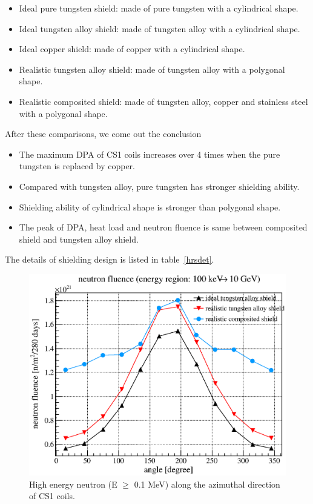 \begin{itemize}
 \setlength{\itemsep}{-5pt}
 \item Ideal pure tungsten shield: made of pure tungsten with a cylindrical shape.
 \item Ideal tungsten alloy shield: made of tungsten alloy with a cylindrical shape.
 \item Ideal copper shield: made of copper with a cylindrical shape.
 \item Realistic tungsten alloy shield: made of tungsten alloy with a polygonal shape.
 \item Realistic composited shield: made of tungsten alloy, copper and stainless steel with a polygonal shape.
\end{itemize}

After these comparisons, we come out the conclusion
\begin{itemize}
 \setlength{\itemsep}{-5pt}
 \item The maximum DPA of CS1 coils increases over 4 times when the pure tungsten is replaced by copper.
 \item Compared with tungsten alloy, pure tungsten has stronger shielding ability.
 \item Shielding ability of cylindrical shape is stronger than polygonal shape.
 \item The peak of DPA, heat load and neutron fluence is same between composited shield and tungsten alloy shield.
\end{itemize}
The details of shielding design is listed in table~\ref{hrsdet}.
 \begin{figure}[H]
  \centering
  \includegraphics[scale=0.43]{chapter3/fig/fluence}
  \caption{High energy neutron (E $\geq$ 0.1 MeV) along the azimuthal direction of CS1 coils.}
  \label{2flux}
 \end{figure}
